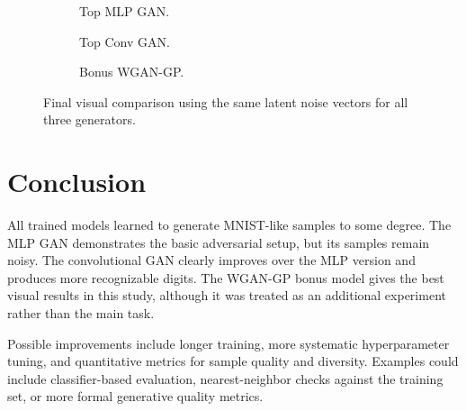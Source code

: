 \begin{figure}[htbp]
    \centering
    \begin{subfigure}{0.32\textwidth}
        \centering
        \caption{Top MLP GAN.}
    \end{subfigure}
    \hfill
    \begin{subfigure}{0.32\textwidth}
        \centering
        \caption{Top Conv GAN.}
    \end{subfigure}
    \hfill
    \begin{subfigure}{0.32\textwidth}
        \centering
        \caption{Bonus WGAN-GP.}
    \end{subfigure}
    \caption{Final visual comparison using the same latent noise vectors for all three generators.}
    \label{fig:final-comparison}
\end{figure}

\section{Conclusion}

All trained models learned to generate MNIST-like samples to some degree. The MLP GAN demonstrates the basic adversarial setup, but its samples remain noisy.
The convolutional GAN clearly improves over the MLP version and produces more recognizable digits. The WGAN-GP bonus model gives the best visual results in this study, although it was treated as an additional experiment rather than the main task.

Possible improvements include longer training, more systematic hyperparameter tuning, and quantitative metrics for sample quality and diversity.
Examples could include classifier-based evaluation, nearest-neighbor checks against the training set, or more formal generative quality metrics.

\printbibliography


